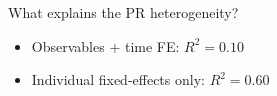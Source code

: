 \documentclass{beamer}
\begin{document}
\begin{frame}{What explains the PR heterogeneity?}
	\begin{itemize}
		\item  Observables $+$ time FE: $R^2=0.10$
		\item  Individual fixed-effects only: $R^2=0.60$
	\end{itemize}
\end{frame}

\end{document}
